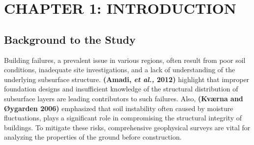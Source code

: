 \documentclass[12pt,a4paper]{report}
\begin{document}
\newpage


\chapter{CHAPTER 1: INTRODUCTION}

\section{Background to the Study}

Building failures, a prevalent issue in various regions, often result from poor soil conditions, inadequate site investigations, and a lack of understanding of the underlying subsurface structure. \textbf{(Amadi, \textit{et al.,} 2012)} highlight that improper foundation designs and insufficient knowledge of the structural distribution of subsurface layers are leading contributors to such failures. Also, \textbf{(Kværna and \textbf{Øygarden} 2006)} emphasized that soil instability often caused by moisture fluctuations, plays a significant role in compromising the structural integrity of buildings. To mitigate these risks, comprehensive geophysical surveys are vital for analyzing the properties of the ground before construction.
\end{document}

